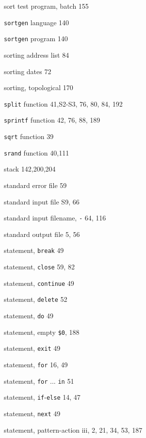 \begin{multicols}{3}
\hangindent=3pc  sort test program, batch 155

\hangindent=3pc  \verb'sortgen' language 140

\hangindent=3pc  \verb'sortgen' program 140

\hangindent=3pc  sorting address list 84

\hangindent=3pc  sorting dates 72

\hangindent=3pc  sorting, topological 170

\hangindent=3pc  \verb'split' function 41,S2-S3, 76, 80, 84, 192

\hangindent=3pc  \verb'sprintf' function 42, 76, 88, 189

\hangindent=3pc  \verb'sqrt' function 39

\hangindent=3pc  \verb'srand' function 40,111

\hangindent=3pc  stack 142,200,204

\hangindent=3pc  standard error file 59

\hangindent=3pc  standard input file S9, 66

\hangindent=3pc  standard input filename, \verb'-' 64, 116

\hangindent=3pc  standard output file 5, 56

\hangindent=3pc  statement, \verb'break' 49

\hangindent=3pc  statement, \verb'close' 59, 82

\hangindent=3pc  statement, \verb'continue' 49

\hangindent=3pc  statement, \verb'delete' 52

\hangindent=3pc  statement, \verb'do' 49

\hangindent=3pc  statement, empty \verb'$0', 188

\hangindent=3pc  statement, \verb'exit' 49

\hangindent=3pc  statement, \verb'for' 16, 49

\hangindent=3pc  statement, \verb'for' ... \verb'in' 51

\hangindent=3pc  statement, \verb'if'-\verb'else' 14, 47

\hangindent=3pc  statement, \verb'next' 49

\hangindent=3pc  statement, pattern-action iii, 2, 21, 34, 53, 187


\end{multicols}
